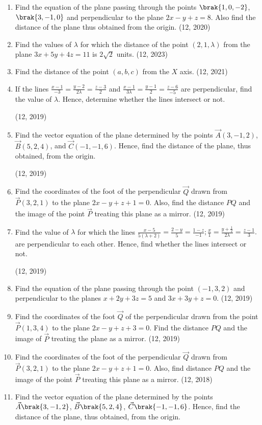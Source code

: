 \begin{enumerate}[label=\thesubsection.\arabic*, ref=\thesubsection.\theenumi]
\item Find the equation of the plane passing through the points $\brak{1, 0, -2}$,  $\brak{3, -1, 0}$ and perpendicular to the plane $2x - y + z = 8$. Also find the distance of the plane thus obtained from the origin.
\hfill (12, 2020)
    \item Find the values of $\lambda$ for which the distance of the point $(2, 1, \lambda)$ from the plane
$        3x + 5y + 4z = 11$
    is $2\sqrt{2}$ units.
    \hfill (12, 2023)
	\item Find the distance of the point $(a, b, c)$ from the $X$ axis. \hfill (12, 2021)
	\item If the lines $\frac{x-1}{-3} = \frac{y-2}{2\lambda} = \frac{z-3}{2}$ and $\frac{x-1}{3\lambda} = \frac{y-1}{2} = \frac{z-6}{-5}$ are perpendicular, find the value of $\lambda$. Hence, determine whether the lines intersect or not.

		\hfill (12, 2019)
	\item Find the vector equation of the plane determined by the points $\vec{A}(3, -1, 2)$, $\vec{B}(5, 2, 4)$, and $\vec{C}(-1, -1, 6)$. Hence, find the distance of the plane, thus obtained, from the origin.

		\hfill (12, 2019)
	\item Find the coordinates of the foot of the perpendicular $\vec{Q}$ drawn from $\vec{P}(3, 2, 1)$ to the plane $2x - y + z + 1 = 0$. Also, find the distance $PQ$ and the image of the point $\vec{P}$ treating this plane as a mirror. \hfill (12, 2019)
	\item Find the value of $\lambda$ for which the lines $\frac{x-5}{5(\lambda+2)} = \frac{2-y}{5} = \frac{1-z}{-1}; \frac{x}{1} = \frac{y + \frac{1}{2}}{2\lambda} = \frac{z-1}{3}.$ are perpendicular to each other.
	Hence, find whether the lines intersect or not.

		\hfill (12, 2019)
	\item Find the equation of the plane passing through the point $(-1, 3, 2)$ and perpendicular to the planes $x + 2y + 3z = 5$ and $3x + 3y + z = 0$. \hfill (12, 2019)
	
	\item Find the coordinates of the foot $\vec{Q}$ of the perpendicular drawn from the point $\vec{P}(1, 3, 4)$ to the plane $2x - y + z + 3 = 0$. Find the distance $PQ$ and the image of $\vec{P}$ treating the plane as a mirror. \hfill (12, 2019)
\item Find the coordinates of the foot of the perpendicular $\vec{Q}$ drawn from $\vec{P}(3, 2, 1)$ to the plane $2x - y + z + 1 = 0$. Also, find distance $PQ$ and the image of the point $\vec{P}$ treating this plane as a mirror.
\hfill (12, 2018)
\item Find the vector equation of the plane determined by the points $\vec{A}\brak{3,-1,2}$, $\vec{B}\brak{5,2,4}$, $\vec{C}\brak{-1,-1,6}$. Hence, find the distance of the plane, thus obtained, from the origin.


\end{enumerate}
